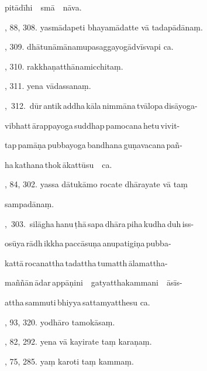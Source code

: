 \hspace{15mm} pitādīhi\ \ smā\ \ nāva.\hfill \pageref{sut:270}\par {}, 88, 308. yasmādapeti bhayamādatte vā tadapādānaṃ.\par \noindent
\hfill \pageref{sut:271}\par {}, 309. dhātunāmānamupasaggayogādvīsvapi ca.\hfill \pageref{sut:272}\par {}, 310. rakkhaṇatthānamicchitaṃ.\hfill \pageref{sut:273}\par {}, 311. yena vādassanaṃ.\hfill \pageref{sut:274}\par {},~312.~dūr\,antik\,addha\,kāla\,nimmāna\,tvālopa\,disāyoga-\par \noindent
\hspace{15mm} vibhatt\,ārappayoga\,suddhap\,pamocana\,hetu\,vivit-\par \noindent
\hspace{15mm} tap\,pamāṇa\,pubbayoga\,bandhana\,guṇavacana\,pañ-\par \noindent
\hspace{15mm} ha\,kathana\,thok\,ākattūsu\ \ ca.\hfill \pageref{sut:275}\par {}, 84, 302. yassa dātukāmo rocate dhārayate vā taṃ\par \noindent
\hspace{15mm} sampadānaṃ.\hfill \pageref{sut:276}\par {},~303.~silāgha\,hanu\,ṭhā\,sapa\,dhāra\,piha\,kudha\,duh\,iss-\par \noindent
\hspace{15mm} osūya\,rādh\,ikkha\,paccāsuṇa\,anupatigiṇa\,pubba-\par \noindent
\hspace{15mm} kattā\,rocanattha\,tadattha\,tumatth\,ālamattha-\par \noindent
\hspace{15mm} maññān\,ādar\,appāṇini\ \ gatyatthakammani\ \ āsīs-\par \noindent
\hspace{15mm} attha\,sammuti\,bhiyya\,sattamyatthesu ca.\hfill \pageref{sut:277}\par {}, 93, 320. yodhāro tamokāsaṃ.\hfill \pageref{sut:278}\par {}, 82, 292. yena vā kayirate taṃ karaṇaṃ.\hfill \pageref{sut:279}\par {}, 75, 285. yaṃ karoti taṃ kammaṃ.\hfill \pageref{sut:280}\par \noindent
